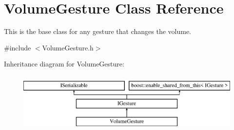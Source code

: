 \hypertarget{class_volume_gesture}{}\section{Volume\+Gesture Class Reference}
\label{class_volume_gesture}


This is the base class for any gesture that changes the volume.  




{\ttfamily \#include $<$Volume\+Gesture.\+h$>$}

Inheritance diagram for Volume\+Gesture\+:\begin{figure}[H]
\begin{center}
\leavevmode
\includegraphics[height=3.000000cm]{class_volume_gesture}
\end{center}
\end{figure}
